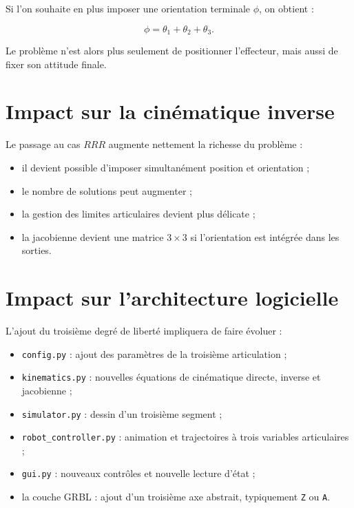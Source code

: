 \documentclass[12pt,a4paper]{report}
\newcommand{\thone}{\theta_1}
\newcommand{\thtwo}{\theta_2}
\newcommand{\ththree}{\theta_3}
\begin{document}
Si l'on souhaite en plus imposer une orientation terminale $\phi$, on obtient :

\begin{equation}
    \phi = \thone + \thtwo + \ththree.
\end{equation}

Le problème n'est alors plus seulement de positionner l'effecteur, mais aussi de fixer
son attitude finale.

\section{Impact sur la cinématique inverse}

Le passage au cas $RRR$ augmente nettement la richesse du problème :

\begin{itemize}
    \item il devient possible d'imposer simultanément position et orientation ;
    \item le nombre de solutions peut augmenter ;
    \item la gestion des limites articulaires devient plus délicate ;
    \item la jacobienne devient une matrice $3 \times 3$ si l'orientation est intégrée dans les sorties.
\end{itemize}

\section{Impact sur l'architecture logicielle}

L'ajout du troisième degré de liberté impliquera de faire évoluer :

\begin{itemize}
    \item \texttt{config.py} : ajout des paramètres de la troisième articulation ;
    \item \texttt{kinematics.py} : nouvelles équations de cinématique directe, inverse et jacobienne ;
    \item \texttt{simulator.py} : dessin d'un troisième segment ;
    \item \texttt{robot\_controller.py} : animation et trajectoires à trois variables articulaires ;
    \item \texttt{gui.py} : nouveaux contrôles et nouvelle lecture d'état ;
    \item la couche GRBL : ajout d'un troisième axe abstrait, typiquement \texttt{Z} ou \texttt{A}.
\end{itemize}
\end{document}

